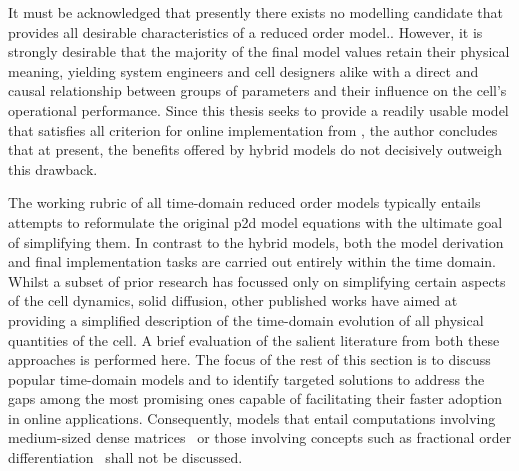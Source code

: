 It must be acknowledged that presently  there exists no modelling candidate that
provides  all desirable  characteristics of  a reduced  order model.. However,
it is  strongly desirable  that the  majority of the  final model  values retain
their physical meaning, yielding system  engineers and cell designers alike with
a  direct  and  causal  relationship  between groups  of  parameters  and  their
influence  on  the  cell's  operational performance.  Since  this  thesis  seeks
to  provide a  readily  usable  model that  satisfies  all   criterion  for online implementation  from ,  the author
concludes  that  at present,  the  benefits  offered  by  hybrid models  do  not
decisively outweigh this drawback.


The working  rubric of  all time-domain reduced  order models  typically entails
attempts to reformulate the original \gls{p2d} model equations with the ultimate
goal  of simplifying  them. In  contrast to  the hybrid  models, both  the model
derivation and  final implementation tasks  are carried out entirely  within the
time domain. Whilst a subset of  prior research has focussed only on simplifying
certain aspects  of the  cell dynamics, \eg{}  solid diffusion,  other published
works  have aimed  at  providing  a simplified  description  of the  time-domain
evolution of  all physical  quantities of  the cell. A  brief evaluation  of the
salient literature  from both these approaches  is performed here. The  focus of
the  rest of  this  section is  to  discuss popular  time-domain  models and  to
identify  targeted  solutions to  address  the  gaps  among the  most  promising
ones  capable of  facilitating  their faster  adoption  in online  applications.
Consequently,  models  that  entail computations  involving  medium-sized  dense
matrices~\cite{Li2016}  or those  involving  concepts such  as fractional  order
differentiation~\cite{Sabatier2015, Li2017} shall not be discussed.


